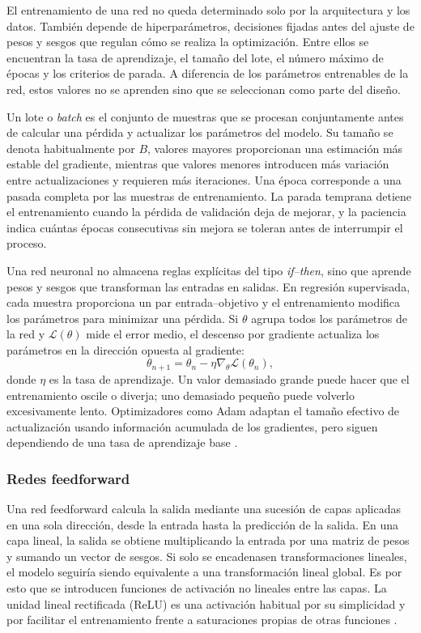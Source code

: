El entrenamiento de una red no queda determinado solo por la arquitectura y los
datos. También depende de hiperparámetros, decisiones fijadas antes del
ajuste de pesos y sesgos que regulan cómo se realiza la optimización. Entre ellos
se encuentran la tasa de aprendizaje, el tamaño del lote, el número máximo de
épocas y los criterios de parada. A diferencia de los parámetros entrenables de
la red, estos valores no se aprenden sino que se seleccionan como parte del diseño.

Un lote o \textit{batch} es el conjunto de muestras que se procesan conjuntamente
antes de calcular una pérdida y actualizar los parámetros del modelo. Su tamaño
se denota habitualmente por $B$, valores mayores proporcionan una estimación más
estable del gradiente, mientras que valores menores introducen más variación
entre actualizaciones y requieren más iteraciones. Una época corresponde a
una pasada completa por las muestras de entrenamiento. La parada temprana detiene
el entrenamiento cuando la pérdida de validación deja de mejorar, y la paciencia
indica cuántas épocas consecutivas sin mejora se toleran antes de interrumpir el
proceso.

Una red neuronal no almacena reglas explícitas del tipo \textit{if--then}, sino que
aprende pesos y sesgos que transforman las entradas en salidas. En regresión supervisada,
cada muestra proporciona un par entrada--objetivo y el entrenamiento modifica los
parámetros para minimizar una pérdida. Si $\theta$ agrupa todos los parámetros de la red y
$\mathcal{L}(\theta)$ mide el error medio, el descenso por gradiente actualiza
los parámetros en la dirección opuesta al gradiente:
\[
  \theta_{n+1}=\theta_n-\eta\nabla_\theta\mathcal{L}(\theta_n),
\]
donde $\eta$ es la tasa de aprendizaje. Un valor demasiado grande puede hacer
que el entrenamiento oscile o diverja; uno demasiado pequeño puede volverlo
excesivamente lento. Optimizadores como Adam adaptan el tamaño efectivo de 
actualización usando información acumulada de los gradientes, pero siguen 
dependiendo de una tasa de aprendizaje base \cite{kingma2015adam}.

\subsubsection{Redes feedforward}

Una red feedforward calcula la salida mediante una sucesión de capas aplicadas
en una sola dirección, desde la entrada hasta la predicción de la salida. En una 
capa lineal, la salida se obtiene multiplicando la entrada por una matriz de pesos y 
sumando un vector de sesgos. Si solo se encadenasen transformaciones lineales, 
el modelo seguiría siendo equivalente a una transformación lineal global. Es por 
esto que se introducen funciones de activación no lineales entre las capas. La 
unidad lineal rectificada (ReLU) es una activación habitual por su simplicidad 
y por facilitar el entrenamiento frente a saturaciones propias de otras funciones 
\cite{nair2010relu}.

